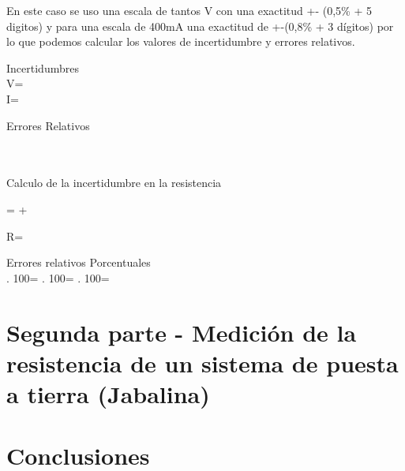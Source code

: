 \documentclass[12pt, letterpaper]{article}
\begin{document}
En este caso se uso una escala de tantos V con una exactitud +- (0,5\% + 5 digitos) y para una escala de 400mA una exactitud de +-(0,8\% + 3 dígitos)
por lo que podemos calcular los valores de incertidumbre y errores relativos.
\\
\item  Incertidumbres\\
\Delta  V=\\
\Delta I=\\
\item Errores Relativos\\
\\
 \\
\item Calculo de la incertidumbre en la resistencia\newline

 = +  \newline

\Delta R=\newline

\item Errores relativos Porcentuales\\

 . 100=\newline
{} . 100=\newline
{} . 100=\newline


\section{Segunda parte - Medición de la resistencia de un sistema de puesta a tierra (Jabalina)}

\section{Conclusiones}





\label{LastPage}
\end{document}
